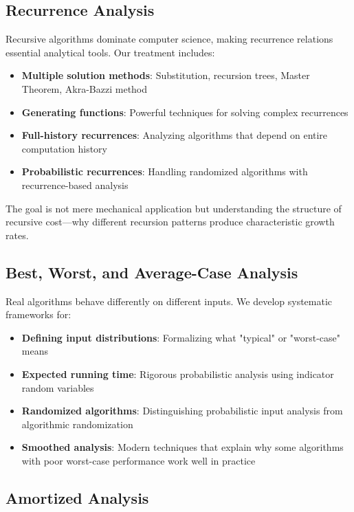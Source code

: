 \subsection{Recurrence Analysis}

Recursive algorithms dominate computer science, making recurrence relations essential analytical tools. Our treatment includes:

\begin{itemize}
    \item \textbf{Multiple solution methods}: Substitution, recursion trees, Master Theorem, Akra-Bazzi method
    \item \textbf{Generating functions}: Powerful techniques for solving complex recurrences
    \item \textbf{Full-history recurrences}: Analyzing algorithms that depend on entire computation history
    \item \textbf{Probabilistic recurrences}: Handling randomized algorithms with recurrence-based analysis
\end{itemize}
The goal is not mere mechanical application but understanding the structure of recursive cost—why different recursion patterns produce characteristic growth rates.

\subsection{Best, Worst, and Average-Case Analysis}

Real algorithms behave differently on different inputs. We develop systematic frameworks for:

\begin{itemize}
    \item \textbf{Defining input distributions}: Formalizing what "typical" or "worst-case" means
    \item \textbf{Expected running time}: Rigorous probabilistic analysis using indicator random variables
    \item \textbf{Randomized algorithms}: Distinguishing probabilistic input analysis from algorithmic randomization
    \item \textbf{Smoothed analysis}: Modern techniques that explain why some algorithms with poor worst-case performance work well in practice
\end{itemize}

\subsection{Amortized Analysis}

